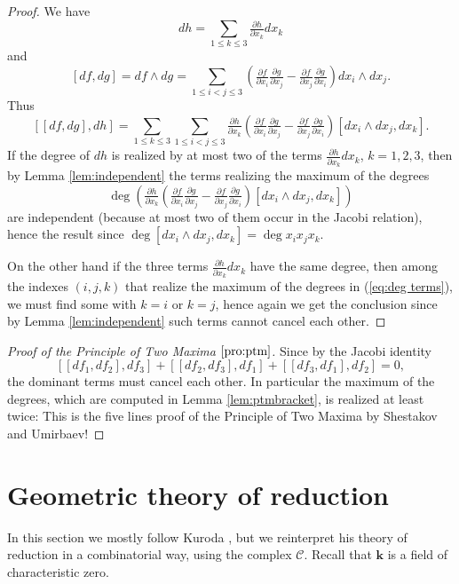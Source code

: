 \documentclass[reqno,oneside,11pt]{amsart}
\theoremstyle{plain}
\theoremstyle{definition}
\newcommand{\K}{\mathbf{k}}
\newcommand{\Comp}{\mathcal{C}}
\newcommand{\parti}[2]{\tfrac{\partial #2}{\partial x_{#1}}}
\renewcommand{\le}{\leqslant}
\begin{document}
\begin{proof}
We have
$$ dh = \sum_{1 \le k \le 3} \parti{k}{h} dx_k$$
and
$$[df,dg] = df \wedge dg = \sum_{1\le i < j \le 3} \left( \parti{i}{f}\parti{j}{g} - \parti{j}{f}\parti{i}{g}\right)  dx_i \wedge  dx_j.$$
Thus
$$\left[ [df,dg], dh \right] = \sum_{1 \le k \le 3} \sum_{1\le i < j \le 3} \parti{k}{h}\left( \parti{i}{f}\parti{j}{g} - \parti{j}{f}\parti{i}{g}\right)  \left[dx_i \wedge  dx_j,dx_k\right].$$
If the degree of $dh$ is realized by at most two of the terms  $\parti{k}{h} dx_k$, $k =1,2,3$, then by Lemma \ref{lem:independent} the terms realizing the maximum  of the degrees
\begin{equation}\label{eq:deg terms}
\deg \left( \parti{k}{h}\left( \parti{i}{f}\parti{j}{g} - \parti{j}{f}\parti{i}{g}\right)  \left[dx_i \wedge  dx_j,dx_k\right] \right)
\end{equation}
are independent (because at most two of them occur in the Jacobi relation), hence the result since $\deg \left[dx_i \wedge  dx_j,dx_k\right] = \deg x_ix_jx_k$.

On the other hand if the three terms  $\parti{k}{h} dx_k$ have the same degree, then among the indexes $(i,j,k)$ that realize the maximum of the degrees in (\ref{eq:deg terms}), we must find some with $k = i$ or $k=j$, hence again we get the conclusion since by Lemma \ref{lem:independent} such terms cannot cancel each other.
\end{proof}

\begin{proof}[{Proof of the Principle of Two Maxima $\ref{pro:ptm}$}]
Since by the Jacobi identity
$$\left[ [df_1,df_2], df_3 \right] + \left[ [df_2,df_3], df_1 \right] + \left[ [df_3,df_1], df_2 \right] = 0,$$
the dominant terms must cancel each other.
In particular the maximum of the degrees, which are computed in Lemma \ref{lem:ptmbracket}, is realized at least twice: This is the five lines proof of the Principle of Two Maxima by Shestakov and Umirbaev!
\end{proof}

\section{Geometric theory of reduction} \label{sec:theory reduction}

In this section we mostly follow Kuroda \cite{Ku:main}, but we reinterpret his theory of reduction in a combinatorial way, using the complex $\Comp$.
Recall that $\K$ is a field of characteristic zero.
\end{document}
